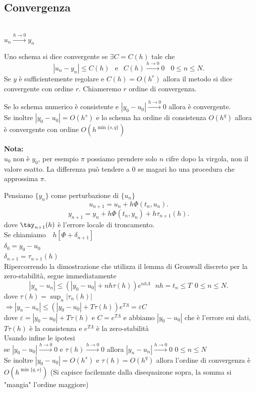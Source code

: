 \documentclass[12px]{article}
\begin{document}
\subsection{Convergenza}\\
$u_n \xrightarrow{ h \rightarrow 0 } y_n$
\begin{defi}[Convergenza]
	Uno schema si dice convergente se $\exists C = C(h)$ tale che 
	\[
		|u_n - y_n|\leq C(h) \ \ \text{ e } \ \ C(h) \xrightarrow{h \rightarrow 0} 0\ \ \ \ 0\leq n\leq N
	.\] 
Se $y$ è sufficientemente regolare  e $C(h) = O(h^r)$ allora il metodo si dice convergente con ordine $r$. Chiameremo $r$ ordine di convergenza.
\end{defi}
\begin{teo}
	Se lo schema numerico è consistente e $|y_0-u_0| \xrightarrow{h \rightarrow 0} 0$ allora è convergente.\\
	Se inoltre $|y_0 - u_0| = O(h^s)$ e lo schema ha ordine di consistenza $O(h^q)$ allora è convergente con ordine  $O(h^{\min\{s,q\}})$
\end{teo}
\textbf{Nota:}\\
$u_0 $ non è $y_0$, per esempio $\pi$ possiamo prendere solo $n$ cifre dopo la virgola, non il valore esatto. La differenza può tendere a $0$ se magari ho una procedura che approssima $\pi$.
 \begin{dimo}
	 Pensiamo $\{y_n\}$ come perturbazione di $\{u_n\}$ 
	 \[
		 u_{n+1} = u_n + h\Phi(t_n,u_n)
	 .\] 
	 \[
		 y_{n+1} = y_n + h\Phi(t_n,y_n) + h \tau_{n+1}(h)
	 .\] 
	 dove $\tay_{n+1}(h)$ è l'errore locale di troncamento.\\
	 Se chiamiamo\ \ $h[\Phi + \delta_{n+1}]$\\
	 $\delta_0 = y_0 - u_0$\\
	 $\delta_{n+1} = \tau_{n+1}(h)$ \\
	 Ripercorrendo la dimostrazione che utilizza il lemma di Gronwall discreto per la zero-stabilità, segue immediatamente
	 \[
		 |y_n - u_n| \leq (|y_0 - u_0| + nh\tau(h))e^{nh\Lambda} \ \ \ nh = t_n \leq T \ \ 0\leq n \leq N
	 .\] 
	 dove $\displaystyle\tau(h) = \sup_{n}|\tau_n(h)|$ \\
	 $ \Rightarrow  |y_n - u_n|\leq (|y_0 - u_0| + T\tau (h))e^{T\Lambda}  = \varepsilon C$ \\
	 dove $\varepsilon = |y_0-u_0 | + T\tau(h)$ e $C = e^{T\Lambda}$ e abbiamo $|y_0-u_0|$ che è l'errore sui dati, $T\tau(h)$ è la consistenza e $e^{T\Lambda}$ è la zero-stabilità\\
	 Usando infine le ipotesi\\
	 se  $| y_0 - u_0| \xrightarrow{h \rightarrow 0} 0$ e $\tau(h) \xrightarrow{ h \rightarrow 0} 0$  allora $|y_n-u_n| \xrightarrow{h \rightarrow 0} 0$ $0 \leq n\leq N$\\
	 Se inoltre $|y_0 - u_0| = O(h^s)$ e $\tau(h) = O(h^q)$ allora l'ordine di convergenza è $O(h^{\min\{q,s\}})$ (Si capisce facilemnte dalla disequaizone sopra, la somma si "mangia" l'ordine maggiore)
\end{dimo}
\end{document}
